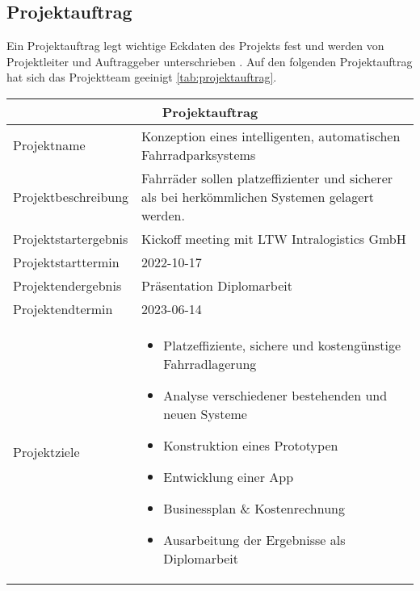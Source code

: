 \subsection{Projektauftrag}

Ein Projektauftrag legt wichtige Eckdaten des Projekts fest und werden von Projektleiter und Auftraggeber unterschrieben . Auf den folgenden Projektauftrag hat sich das Projektteam geeinigt \ref{tab:projektauftrag}.

\begin{longtable}{p{}|p{}}
  \multicolumn{2}{c}{\textbf{Projektauftrag}}                                                                            \\
  \toprule

  Projektname           & Konzeption eines intelligenten, automatischen Fahrradparksystems                               \\ \midrule

  Projektbeschreibung   & Fahrräder sollen platzeffizienter und sicherer als bei herkömmlichen Systemen gelagert werden. \\ \midrule

  Projektstartergebnis  & Kickoff meeting mit LTW Intralogistics GmbH                                                    \\ \midrule

  Projektstarttermin    & 2022-10-17                                                                                     \\ \midrule

  Projektendergebnis    & Präsentation Diplomarbeit                                                                      \\ \midrule

  Projektendtermin      & 2023-06-14                                                                                     \\ \midrule

  Projektziele          &
  \begin{itemize}
    \item Platzeffiziente, sichere und kostengünstige Fahrradlagerung
    \item Analyse verschiedener bestehenden und neuen Systeme
    \item Konstruktion eines Prototypen
    \item Entwicklung einer App
    \item Businessplan \& Kostenrechnung
    \item Ausarbeitung der Ergebnisse als Diplomarbeit
  \end{itemize}                                                       \\  \midrule


\end{longtable}
